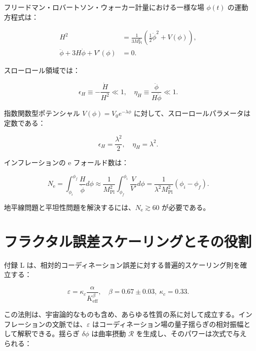 \documentclass[11pt,a4paper]{article}
\newcommand{\eps}{\varepsilon}
\newcommand{\kappac}{\kappa_c}
\newcommand{\Keff}{K_{\mathrm{eff}}}
\newcommand{\Mpl}{M_{\mathrm{Pl}}}
\newcommand{\ninf}{N_{\mathrm{e}}}
\begin{document}
	フリードマン・ロバートソン・ウォーカー計量における一様な場 \(\phi(t)\) の運動方程式は：
	
	\begin{align}
		H^2 &= \frac{1}{3\Mpl^2} \left( \frac{1}{2}\dot{\phi}^2 + V(\phi) \right), \label{eq:friedman1} \\
		\ddot{\phi} + 3H\dot{\phi} + V'(\phi) &= 0. \label{eq:field}
	\end{align}
	
	スローロール領域では：
	
	\begin{equation}
		\epsilon_H \equiv -\frac{\dot{H}}{H^2} \ll 1, \quad \eta_H \equiv \frac{\ddot{\phi}}{H\dot{\phi}} \ll 1.
	\end{equation}
	
	指数関数型ポテンシャル \(V(\phi) = V_0 e^{-\lambda \phi}\) に対して、スローロールパラメータは定数である：
	
	\begin{equation}
		\epsilon_H = \frac{\lambda^2}{2}, \quad \eta_H = \lambda^2.
		\label{eq:slowroll}
	\end{equation}
	
	インフレーションの e フォールド数は：
	
	\begin{equation}
		\ninf = \int_{\phi_i}^{\phi_f} \frac{H}{\dot{\phi}} d\phi \approx \frac{1}{\Mpl^2} \int_{\phi_f}^{\phi_i} \frac{V}{V'} d\phi = \frac{1}{\lambda^2 \Mpl^2} (\phi_i - \phi_f).
	\end{equation}
	
	地平線問題と平坦性問題を解決するには、\(\ninf \gtrsim 60\) が必要である。
	
	\section{フラクタル誤差スケーリングとその役割}
	\label{sec:fractal}
	
	付録 L は、相対的コーディネーション誤差に対する普遍的スケーリング則を確立する：
	
	\begin{equation}
		\eps = \kappac \frac{\alpha}{\Keff^{\beta}}, \quad \beta = 0.67 \pm 0.03,\ \kappac = 0.33.
		\label{eq:error-scaling}
	\end{equation}
	
	この法則は、宇宙論的なものも含め、あらゆる性質の系に対して成立する。インフレーションの文脈では、\(\eps\) はコーディネーション場の量子揺らぎの相対振幅として解釈できる。揺らぎ \(\delta \phi\) は曲率摂動 \(\mathcal{R}\) を生成し、そのパワーは次式で与えられる：
	
\end{document}
